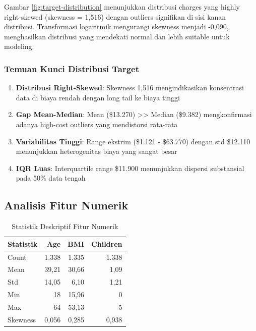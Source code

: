 Gambar \ref{fig:target-distribution} menunjukkan distribusi charges yang highly right-skewed (skewness = 1,516) dengan outliers signifikan di sisi kanan distribusi. Transformasi logaritmik mengurangi skewness menjadi -0,090, menghasilkan distribusi yang mendekati normal dan lebih suitable untuk modeling.

\subsubsection{Temuan Kunci Distribusi Target}

\begin{enumerate}
    \item \textbf{Distribusi Right-Skewed}: Skewness 1,516 mengindikasikan konsentrasi data di biaya rendah dengan long tail ke biaya tinggi
    \item \textbf{Gap Mean-Median}: Mean (\$13.270) >> Median (\$9.382) mengkonfirmasi adanya high-cost outliers yang mendistorsi rata-rata
    \item \textbf{Variabilitas Tinggi}: Range ekstrim (\$1.121 - \$63.770) dengan std \$12.110 menunjukkan heterogenitas biaya yang sangat besar
    \item \textbf{IQR Luas}: Interquartile range \$11.900 menunjukkan dispersi substansial pada 50\% data tengah
\end{enumerate}

\subsection{Analisis Fitur Numerik}
\label{subsec:analisis-numerik}

\begin{table}[H]
\centering
\caption{Statistik Deskriptif Fitur Numerik}
\label{tab:numeric-stats}
\begin{tabular}{|l|r|r|r|}
\hline
\textbf{Statistik} & \textbf{Age} & \textbf{BMI} & \textbf{Children} \\
\hline
Count & 1.338 & 1.335 & 1.338 \\
Mean & 39,21 & 30,66 & 1,09 \\
Std & 14,05 & 6,10 & 1,21 \\
Min & 18 & 15,96 & 0 \\
Max & 64 & 53,13 & 5 \\
Skewness & 0,056 & 0,285 & 0,938 \\
\hline
\end{tabular}
\end{table}

